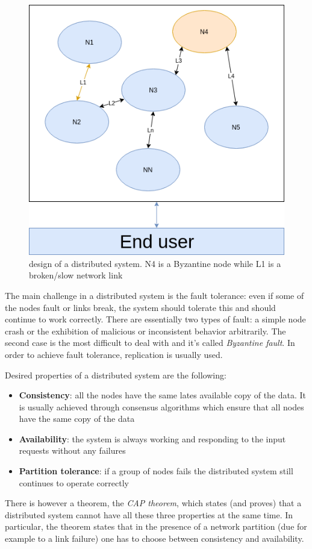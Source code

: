 \begin{figure}[!htb]
	\centering
	\includegraphics[width=0.6\linewidth]{img/distributed-system.png}
	\caption{design of a distributed system. N4 is a Byzantine node while L1 is a
  broken/slow network link}
	\label{fig:distributed-system}
\end{figure}

The main challenge in a distributed system is the fault tolerance: even if some
of the nodes fault or links break, the system should tolerate this and should
continue to work correctly. There are essentially two types of fault: a simple node
crash or the exhibition of malicious or inconsistent behavior arbitrarily. The
second case is the most difficult to deal with and it's called \emph{Byzantine
fault}. In order to achieve fault tolerance, replication is usually used.

Desired properties of a distributed system are the following:
\begin{itemize}
  \item \textbf{Consistency}: all the nodes have the same lates available copy of
  the data. It is usually achieved through consensus algorithms which ensure that
  all nodes have the same copy of the data
  \item \textbf{Availability}: the system is always working and responding to the
  input requests without any failures
  \item \textbf{Partition tolerance}: if a group of nodes fails the distributed
  system still continues to operate correctly
\end{itemize}
There is however a theorem, the \emph{CAP theorem}, which states (and proves)
that a distributed system cannot have all these three properties at the same time.
In particular, the theorem states that in the presence of a network partition (due
for example to a link failure) one has to choose between consistency and availability.



